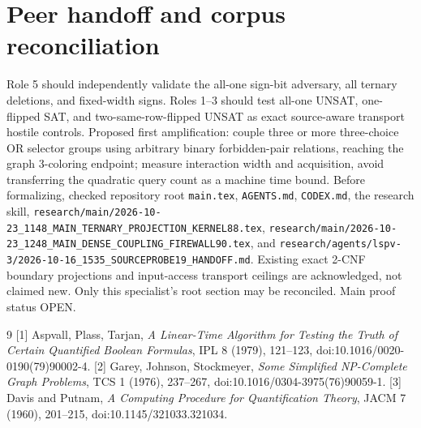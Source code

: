 \documentclass[11pt]{article}
\begin{document}
\section{Peer handoff and corpus reconciliation}
Role 5 should independently validate the all-one sign-bit adversary, all ternary deletions, and fixed-width signs. Roles 1--3 should test all-one UNSAT, one-flipped SAT, and two-same-row-flipped UNSAT as exact source-aware transport hostile controls. Proposed first amplification: couple three or more three-choice OR selector groups using arbitrary binary forbidden-pair relations, reaching the graph 3-coloring endpoint; measure interaction width and acquisition, avoid transferring the quadratic query count as a machine time bound.
Before formalizing, checked repository root \texttt{main.tex}, \texttt{AGENTS.md}, \texttt{CODEX.md}, the research skill, \texttt{research/main/2026-10-23_1148_MAIN_TERNARY_PROJECTION_KERNEL88.tex}, \texttt{research/main/2026-10-23_1248_MAIN_DENSE_COUPLING_FIREWALL90.tex}, and \texttt{research/agents/lspv-3/2026-10-16_1535_SOURCEPROBE19_HANDOFF.md}. Existing exact 2-CNF boundary projections and input-access transport ceilings are acknowledged, not claimed new. Only this specialist's root section may be reconciled. Main proof status OPEN.
\begin{thebibliography}{9}
[1] Aspvall, Plass, Tarjan, \emph{A Linear-Time Algorithm for Testing the Truth of Certain Quantified Boolean Formulas}, IPL 8 (1979), 121--123, doi:10.1016/0020-0190(79)90002-4.
[2] Garey, Johnson, Stockmeyer, \emph{Some Simplified NP-Complete Graph Problems}, TCS 1 (1976), 237--267, doi:10.1016/0304-3975(76)90059-1.
[3] Davis and Putnam, \emph{A Computing Procedure for Quantification Theory}, JACM 7 (1960), 201--215, doi:10.1145/321033.321034.
\end{thebibliography}
\end{document}
